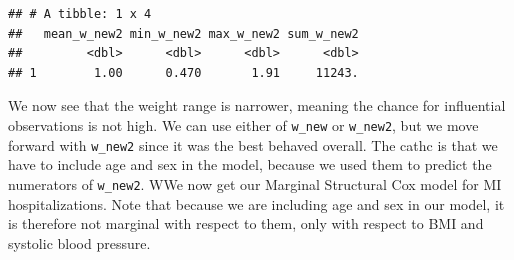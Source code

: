 \documentclass[
]{book}
\newenvironment{Shaded}{\begin{snugshade}}{\end{snugshade}}
\newcommand{\CommentTok}[1]{\textcolor[rgb]{0.56,0.35,0.01}{\textit{#1}}}
\newcommand{\DataTypeTok}[1]{\textcolor[rgb]{0.13,0.29,0.53}{#1}}
\newcommand{\DecValTok}[1]{\textcolor[rgb]{0.00,0.00,0.81}{#1}}
\newcommand{\KeywordTok}[1]{\textcolor[rgb]{0.13,0.29,0.53}{\textbf{#1}}}
\newcommand{\NormalTok}[1]{#1}
\newcommand{\OperatorTok}[1]{\textcolor[rgb]{0.81,0.36,0.00}{\textbf{#1}}}
\newcommand{\StringTok}[1]{\textcolor[rgb]{0.31,0.60,0.02}{#1}}
\begin{document}
\begin{Shaded}
\end{Shaded}

\begin{verbatim}
## # A tibble: 1 x 4
##   mean_w_new2 min_w_new2 max_w_new2 sum_w_new2
##         <dbl>      <dbl>      <dbl>      <dbl>
## 1        1.00      0.470       1.91     11243.
\end{verbatim}

We now see that the weight range is narrower, meaning the chance for influential observations is not high. We can use either of \texttt{w\_new} or \texttt{w\_new2}, but we move forward with \texttt{w\_new2} since it was the best behaved overall. The cathc is that we have to include age and sex in the model, because we used them to predict the numerators of \texttt{w\_new2}. WWe now get our Marginal Structural Cox model for MI hospitalizations. Note that because we are including age and sex in our model, it is therefore not marginal with respect to them, only with respect to BMI and systolic blood pressure.
\end{document}
